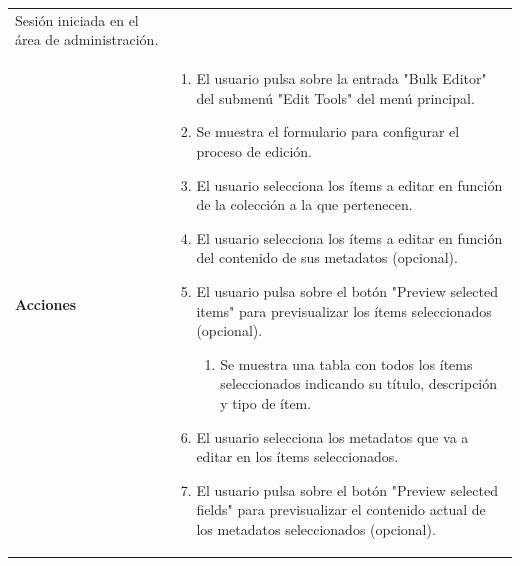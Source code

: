 \documentclass[
]{article}
\providecommand{\tightlist}{%
  \setlength{\itemsep}{0pt}\setlength{\parskip}{0pt}}
\begin{document}
\begin{longtable}[]{@{}ll@{}}
\begin{minipage}[t]{0.79\columnwidth}
Sesión iniciada en el área de administración.\strut
\end{minipage}\tabularnewline
\begin{minipage}[t]{0.15\columnwidth}\raggedright
\textbf{Acciones}\strut
\end{minipage} & \begin{minipage}[t]{0.79\columnwidth}\raggedright
\begin{enumerate}
\def\labelenumi{\arabic{enumi}.}
\tightlist
\item
  El usuario pulsa sobre la entrada "Bulk Editor" del submenú "Edit
  Tools" del menú principal.
\item
  Se muestra el formulario para configurar el proceso de edición.
\item
  El usuario selecciona los ítems a editar en función de la colección a
  la que pertenecen.
\item
  El usuario selecciona los ítems a editar en función del contenido de
  sus metadatos (opcional).
\item
  El usuario pulsa sobre el botón "Preview selected items" para
  previsualizar los ítems seleccionados (opcional).

  \begin{enumerate}
  \def\labelenumii{\alph{enumii}.}
  \tightlist
  \item
    Se muestra una tabla con todos los ítems seleccionados indicando su
    título, descripción y tipo de ítem.
  \end{enumerate}
\item
  El usuario selecciona los metadatos que va a editar en los ítems
  seleccionados.
\item
  El usuario pulsa sobre el botón "Preview selected fields" para
  previsualizar el contenido actual de los metadatos seleccionados
  (opcional).


\end{enumerate}
\end{minipage}
\end{longtable}
\end{document}
